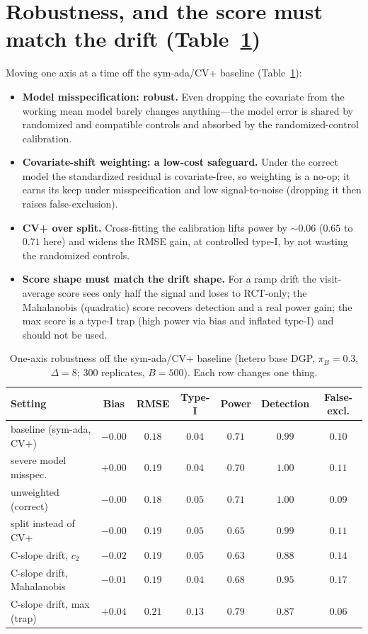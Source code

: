 \documentclass[11pt]{article}
\begin{document}
\section{Robustness, and the score must match the drift (Table~\ref{tab:robust})}
Moving one axis at a time off the sym-ada/CV+ baseline (Table~\ref{tab:robust}):
\begin{itemize}\itemsep1pt
\item \textbf{Model misspecification: robust.} Even dropping the covariate from the working mean model barely changes anything---the model error is shared by randomized and compatible controls and absorbed by the randomized-control calibration.
\item \textbf{Covariate-shift weighting: a low-cost safeguard.} Under the correct model the standardized residual is covariate-free, so weighting is a no-op; it earns its keep under misspecification and low signal-to-noise (dropping it then raises false-exclusion).
\item \textbf{CV+ over split.} Cross-fitting the calibration lifts power by $\sim$$0.06$ ($0.65$ to $0.71$ here) and widens the RMSE gain, at controlled type-I, by not wasting the randomized controls.
\item \textbf{Score shape must match the drift shape.} For a ramp drift the visit-average score sees only half the signal and loses to RCT-only; the Mahalanobis (quadratic) score recovers detection and a real power gain; the max score is a type-I trap (high power via bias and inflated type-I) and should not be used.
\end{itemize}

\begin{table}[ht]\centering
\caption{One-axis robustness off the sym-ada/CV+ baseline (hetero base DGP, $\pi_B{=}0.3$, $\Delta{=}8$; $300$ replicates, $B{=}500$). Each row changes one thing.}
\label{tab:robust}
\begin{tabular}{lcccccc}
\toprule
Setting & Bias & RMSE & Type-I & Power & Detection & False-excl. \\
\midrule
baseline (sym-ada, CV+) & $-0.00$ & $0.18$ & $0.04$ & $0.71$ & $0.99$ & $0.10$ \\
severe model misspec.\  & $+0.00$ & $0.19$ & $0.04$ & $0.70$ & $1.00$ & $0.11$ \\
unweighted (correct)    & $-0.00$ & $0.18$ & $0.05$ & $0.71$ & $1.00$ & $0.09$ \\
split instead of CV+    & $-0.00$ & $0.19$ & $0.05$ & $0.65$ & $0.99$ & $0.11$ \\
C-slope drift, $c_2$    & $-0.02$ & $0.19$ & $0.05$ & $0.63$ & $0.88$ & $0.14$ \\
C-slope drift, Mahalanobis & $-0.01$ & $0.19$ & $0.04$ & $0.68$ & $0.95$ & $0.17$ \\
C-slope drift, max (trap)  & $+0.04$ & $0.21$ & $0.13$ & $0.79$ & $0.87$ & $0.06$ \\
\bottomrule
\end{tabular}
\end{table}
\end{document}
